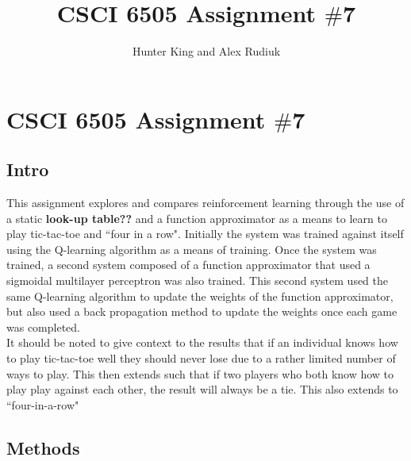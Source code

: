 \documentclass[12pt,a4paper]{article}
\author{Hunter King and Alex Rudiuk}
\title{CSCI 6505 Assignment $\#$7}
\begin{document}
\section*{CSCI 6505 Assignment $\#$7}
\subsection*{Intro}
This assignment explores and compares reinforcement learning through the use of a static \textbf{look-up table??} and a function approximator as a means to learn to play tic-tac-toe and ``four in a row". Initially the system was trained against itself using the Q-learning algorithm as a means of training. Once the system was trained, a second system composed of a function approximator that used a sigmoidal multilayer perceptron was also trained. This second system used the same Q-learning algorithm to update the weights of the function approximator, but also used a back propagation method to update the weights once each game was completed.\\
It should be noted to give context to the results that if an individual knows how to play tic-tac-toe well they should never lose due to a rather limited number of ways to play. This then extends such that if two players who both know how to play play against each other, the result will always be a tie. This also extends to ``four-in-a-row"
\subsection*{Methods}
\end{document}
